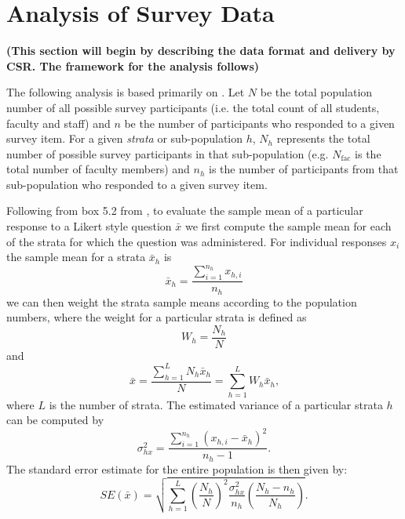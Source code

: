 \documentclass[12pt]{article} %
\begin{document}

\section*{Analysis of Survey Data}

{\bf (This section will begin by describing the data format and delivery by CSR. The framework for the
  analysis follows)}

The following analysis is based primarily on \cite{Levy}. Let $N$ be the total population number of all
possible survey participants (i.e. the total count of all students, faculty and staff) and $n$ be the number
of participants who responded to a given survey item. For a given {\it strata} or sub-population $h$, $N_h$
represents the total number of possible survey participants in that sub-population (e.g. $N_{\mathrm{fac}}$ is
the total number of faculty members) and $n_h$ is the number of participants from that sub-population who
responded to a given survey item. 

Following from box 5.2 from \cite{Levy}, to evaluate the sample mean of a particular response to a Likert style
question $\bar{x}$ we first compute the sample mean for each of the strata for which the question was
administered. For individual responses $x_i$ the sample mean for a strata $\bar{x}_h$ is
\begin{equation}
\bar{x}_h=\frac{\sum\limits_{i=1}^{n_h}x_{h,i}}{n_h}
\end{equation} 
we can then weight the strata sample means according to the population numbers, where the weight for a
particular strata is defined as
\begin{equation}
W_h =\frac{N_h}{N}
\end{equation}
and
\begin{equation}
\bar{x}=\frac{\sum\limits_{h=1}^L N_h \bar{x}_h}{N}=\sum\limits_{h=1}^L W_h \bar{x}_h\mbox{,}
\end{equation}
where $L$ is the number of strata. The estimated variance of a particular strata $h$ can be computed by
\begin{equation}
\sigma^2_{hx}=\frac{\sum\limits_{i=1}^{n_h}(x_{h,i}-\bar{x}_h)^2}{n_h-1}\mbox{.}
\end{equation}
The standard error estimate for the entire population is then given by:
\begin{equation}
SE(\bar{x})=\sqrt{\sum\limits_{h=1}^L \left( \frac{N_h}{N} \right)^2\frac{\sigma^2_{hx}}{n_h} \left( \frac{N_h-n_h}{N_h} \right) }\mbox{.}
\end{equation}
\end{document}
